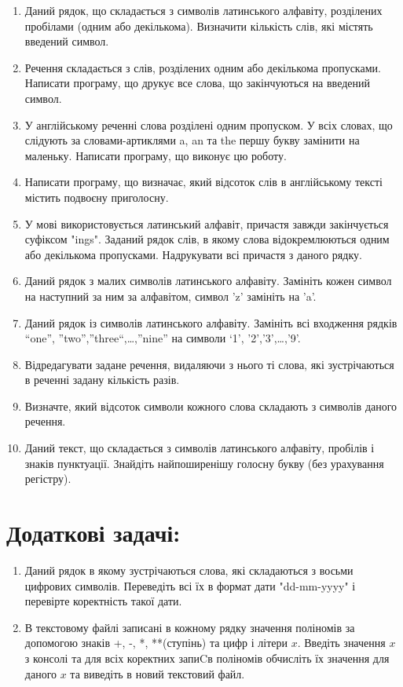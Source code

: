 \documentclass[a5paper,titlepage,openany,twoside,draft]{book_unv}%
\begin{document}
\begin{enumerate}
\item
  Даний рядок, що складається з символів латинського алфавіту,
  розділених пробілами (одним або декількома). Визначити кількість слів,
  які містять введений символ.
\item
  Речення складається з слів, розділених одним або декількома
  пропусками. Написати програму, що друкує все слова, що закінчуються на
  введений символ.
\item
  У англійському реченні слова розділені одним пропуском. У всіх словах, що 
слідують за словами-артиклями a, an та the першу букву замінити на маленьку.
  Написати програму, що виконує цю роботу.
\item
  Написати програму, що визначає, який відсоток слів в англійському
  тексті містить подвоєну приголосну.
\item
  У мові використовується латинський алфавіт, причастя завжди
  закінчується суфіксом "ings". Заданий рядок слів, в якому слова
  відокремлюються одним або декількома пропусками. Надрукувати всі причастя
  з даного рядку.
\item
  Даний рядок з малих символів латинського алфавіту. Замініть кожен
  символ на наступний за ним за алфавітом, символ 'z' замініть на 'a'.
\item
  Даний рядок із символів латинського алфавіту. Замініть всі входження
  рядків ``one'', ''two'',''three``,\ldots{},''nine'' на символи `1',
  '2','3',\ldots{},'9'.
\item
  Відредагувати задане речення, видаляючи з нього ті слова, які
  зустрічаються в реченні задану кількість разів.
\item
  Визначте, який відсоток символи кожного слова складають з символів
  даного речення.
\item
  Даний текст, що складається з символів латинського алфавіту, пробілів і
  знаків пунктуації. Знайдіть найпоширенішу голосну букву (без
  урахування регістру).

\end{enumerate}

\section{Додаткові задачі:}

\begin{enumerate}
\def\labelenumi{\arabic{enumi})}
\setcounter{enumi}{27}
\item
  Даний рядок в якому зустрічаються слова, які складаються з восьми
  цифрових символів. Переведіть всі їх в формат дати "dd-mm-yyyy" і
  перевірте коректність такої дати.
\item
  В текстовому файлі записані в кожному рядку значення поліномів за
  допомогою знаків +, -, *, **(ступінь) та цифр і літери $x$. Введіть
  значення $x$ з консолі та для всіх коректних запиCв поліномів обчисліть
  їх значення для даного $x$ та виведіть в новий текстовий файл.
\end{enumerate}
\end{document}
